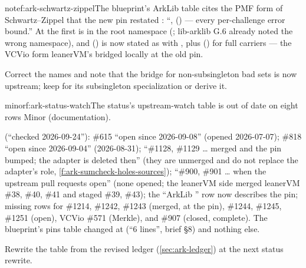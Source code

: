 \begin{finding}{note}{f:ark-schwartz-zippel}{The blueprint's ArkLib table cites the PMF form of Schwartz--Zippel that the new pin restated}
 : ``,
 () --- every
per-challenge error bound.'' At  the first is  in
the root namespace (; lib-arklib G.6 already noted the wrong namespace), and
 () is now stated as
 with \code{[SampleableType …]}, plus
 () for full carriers --- the VCVio form leanerVM's
 bridged locally at the old pin.

 Correct the names and note that the bridge for non-subsingleton bad sets
is now upstream; keep  for its subsingleton specialization or derive
it.
\end{finding}

\begin{finding}{minor}{f:ark-status-watch}{The status's upstream-watch table is out of date on eight rows}
 Minor (documentation).

  (``checked 2026-09-24''): \#615 ``open since 2026-09-08''
(opened 2026-07-07); \#818 ``open since 2026-09-04'' (2026-08-31); ``\#1128, \#1129 \ldots{}
merged and the pin bumped; the adapter is deleted then'' (they are unmerged and do not replace
the adapter's role, \cref{f:ark-sumcheck-holes-sources}); ``\#900, \#901 \ldots{} when the
upstream pull requests open'' (none opened; the leanerVM side merged leanerVM \#38, \#40, \#41
and staged \#39, \#43); the ``ArkLib '' row now describes the pin; missing rows for
\#1214, \#1242, \#1243 (merged, at the pin), \#1244, \#1245, \#1251 (open), VCVio \#571 (Merkle),
and \#907 (closed, complete). The blueprint's pins table changed at  (``6 lines'',
brief §8) and nothing else.

 Rewrite the table from the revised ledger (\cref{sec:ark-ledger}) at
the next status rewrite.
\end{finding}

